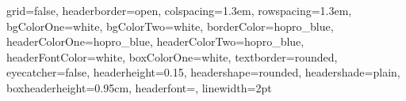 \documentclass[paperheight=140cm,paperwidth=100cm,portrait]{./baposter}
\begin{document}

    \begin{poster}
    {
        grid=false,
        headerborder=open, %
        colspacing=1.3em, %
        rowspacing=1.3em, %
        bgColorOne=white, %
        bgColorTwo=white, %
        borderColor=hopro_blue, %
        headerColorOne=hopro_blue, %
        headerColorTwo=hopro_blue, %
        headerFontColor=white, %
        boxColorOne=white, %
        textborder=rounded, %
        eyecatcher=false, %
        headerheight=0.15\textheight, %
        headershape=rounded, %
        headershade=plain,
        boxheaderheight=0.95cm,
        headerfont=\huge\textsf, %
        linewidth=2pt %
    }
    {}
%
%
    {

}
\end{poster}
\end{document}
